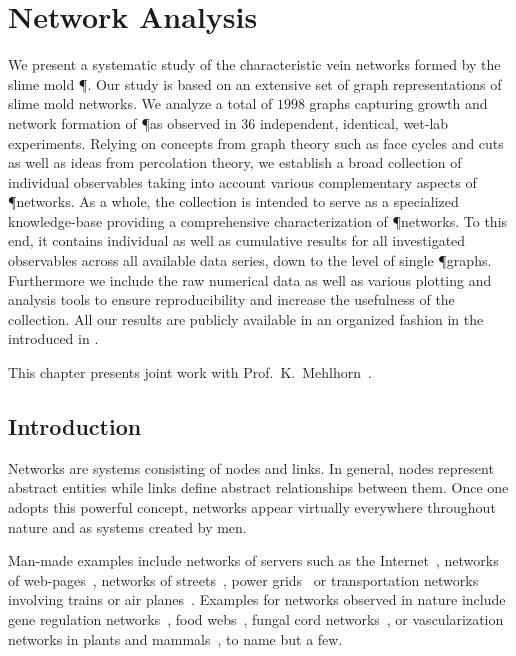 \chapter{Network Analysis}\label{chap:analysis}

	We present a systematic study of the characteristic vein networks formed by the slime mold \P. Our study is based on an extensive set of graph representations of slime mold networks. We analyze a total of $1998$ graphs capturing growth and network formation of \P as observed in $36$ independent, identical, wet-lab experiments. Relying on concepts from graph theory such as face cycles and cuts as well as ideas from percolation theory, we establish a broad collection of individual observables taking into account various complementary aspects of \P networks. As a whole, the collection is intended to serve as a specialized knowledge-base providing a comprehensive characterization of \P networks. To this end, it contains individual as well as cumulative results for all investigated observables across all available data series, down to the level of single \P graphs. Furthermore we include the raw numerical data as well as various plotting and analysis tools to ensure reproducibility and increase the usefulness of the collection. All our results are publicly available in an organized fashion in the \SMGR introduced in .
	
	This chapter presents joint work with Prof.~K.~Mehlhorn~\cite{dirnberger2016}.

\section{Introduction}		

	Networks are systems consisting of nodes and links. In general, nodes represent abstract entities while links define abstract relationships between them. Once one adopts this powerful concept, networks appear virtually everywhere throughout nature and as systems created by men.

	Man-made examples include networks of servers such as the Internet~\cite{faloutsos1999power,karagiannis2004long,huberman1999internet}, networks of web-pages~\cite{adamic2000power}, networks of streets~\cite{jiang2004topological,buhl2006topological}, power grids~\cite{rohden2012self,zhongwei2004comparison} or transportation networks involving trains or air planes~\cite{barrat2004weighted,guimera2004modeling,sienkiewicz2005statistical,sen2003small}. Examples for networks observed in nature include gene regulation networks~\cite{alon1999robustness,milo2002network}, food webs~\cite{pimm1991food,montoya2006ecological}, fungal cord networks~\cite{fricker2007network,heaton2012analysis}, or vascularization networks in plants and mammals~\cite{katifori2010damage,roth2001evolution,koizumi2000series}, to name but a few. 


